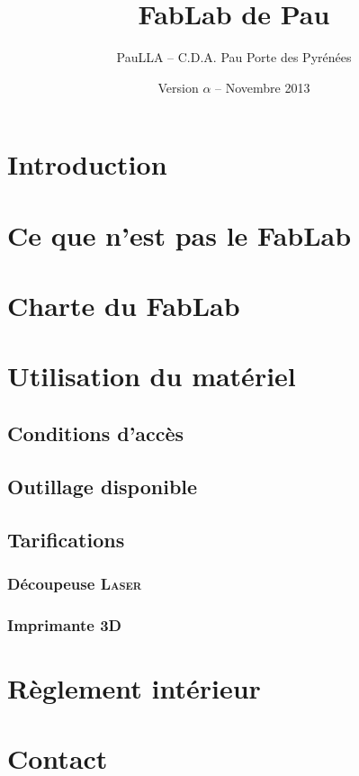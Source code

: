 \documentclass[a5paper,11pt]{article}
\title{FabLab de Pau} %
\author{PauLLA -- C.D.A. Pau Porte des Pyrénées}
\date{\vfill Version $\alpha$ -- Novembre 2013}
\begin{document}
\maketitle\thispagestyle{empty}
\pagebreak
\tableofcontents\thispagestyle{empty}

\pagebreak\section{Introduction}
\pagebreak\section{Ce que n'est pas le FabLab}
\pagebreak\section{Charte du FabLab}

\pagebreak\section{Utilisation du matériel}
\subsection{Conditions d'accès}
\subsection{Outillage disponible}
\subsection{Tarifications}
\subsubsection{Découpeuse \textsc{Laser}}
\subsubsection{Imprimante 3D}
\pagebreak\section{Règlement intérieur}
\pagebreak\section{Contact}

\end{document}

